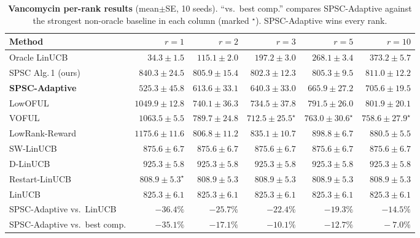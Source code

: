 \documentclass{article}
\begin{document}
\begin{table}[!htbp]
\centering
\caption{\textbf{Vancomycin per-rank results} (mean$\pm$SE, 10
seeds). ``vs.\ best comp.'' compares SPSC-Adaptive against the
strongest non-oracle baseline in each column (marked $^\star$).
SPSC-Adaptive wins every rank.}
\label{tab:vancomycin_full}
\footnotesize
\setlength{\tabcolsep}{2pt}
\begin{tabular}{l@{\hskip 3pt}rrrrr}
\toprule
Method & $r{=}1$ & $r{=}2$ & $r{=}3$ & $r{=}5$ & $r{=}10$ \\
\midrule
Oracle LinUCB                & $34.3\pm 1.5$    & $115.1\pm 2.0$   & $197.2\pm 3.0$         & $268.1\pm 3.4$         & $373.2\pm 5.7$ \\
SPSC Alg.\,1 (ours)          & $840.3\pm 24.5$  & $805.9\pm 15.4$  & $802.3\pm 12.3$        & $805.3\pm 9.5$         & $811.0\pm 12.2$ \\
\textbf{SPSC-Adaptive}       & $\mathbf{525.3\pm 45.8}$ & $\mathbf{613.6\pm 33.1}$ & $\mathbf{640.3\pm 33.0}$ & $\mathbf{665.9\pm 27.2}$ & $\mathbf{705.6\pm 19.5}$ \\
LowOFUL                      & $1049.9\pm 12.8$ & $740.1\pm 36.3$  & $734.5\pm 37.8$        & $791.5\pm 26.0$        & $801.9\pm 20.1$ \\
VOFUL                        & $1063.5\pm 5.5$  & $789.7\pm 24.8$  & $712.5\pm 25.5^\star$  & $763.0\pm 30.6^\star$  & $758.6\pm 27.9^\star$ \\
LowRank-Reward               & $1175.6\pm 11.6$ & $806.8\pm 11.2$  & $835.1\pm 10.7$        & $898.8\pm 6.7$         & $880.5\pm 5.5$ \\
SW-LinUCB                    & $875.6\pm 6.7$   & $875.6\pm 6.7$   & $875.6\pm 6.7$         & $875.6\pm 6.7$         & $875.6\pm 6.7$ \\
D-LinUCB                     & $925.3\pm 5.8$   & $925.3\pm 5.8$   & $925.3\pm 5.8$         & $925.3\pm 5.8$         & $925.3\pm 5.8$ \\
Restart-LinUCB               & $808.9\pm 5.3^\star$ & $808.9\pm 5.3$ & $808.9\pm 5.3$         & $808.9\pm 5.3$         & $808.9\pm 5.3$ \\
LinUCB                       & $825.3\pm 6.1$   & $825.3\pm 6.1$   & $825.3\pm 6.1$         & $825.3\pm 6.1$         & $825.3\pm 6.1$ \\
\midrule
\multicolumn{1}{l}{SPSC-Adaptive vs.\ LinUCB}     & $-36.4\%$ & $-25.7\%$ & $-22.4\%$ & $-19.3\%$ & $-14.5\%$ \\
\multicolumn{1}{l}{SPSC-Adaptive vs.\ best comp.} & $-35.1\%$ & $-17.1\%$ & $-10.1\%$ & $-12.7\%$ & $\phantom{-}-7.0\%$ \\
\bottomrule
\end{tabular}
\end{table}
\end{document}
